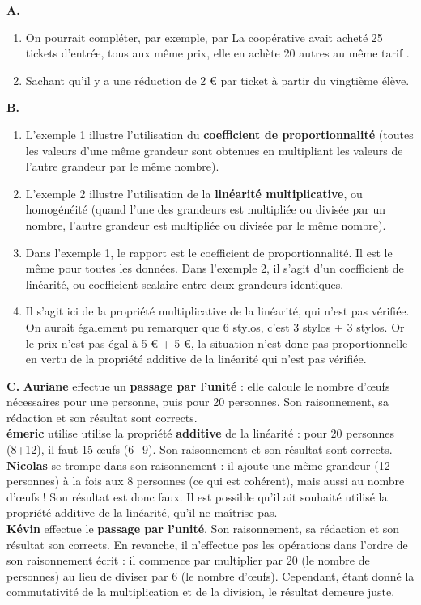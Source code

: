\begin{corrige}
{\bf A.} 
\begin{enumerate}
   \item On pourrait compléter, par exemple, par \og La coopérative avait acheté 25 tickets d'entrée, tous aux même prix, elle en achète 20 autres au même tarif \fg.
   \item \og Sachant qu'il y a une réduction de 2 \euro{} par ticket à partir du vingtième élève. \fg{} \\
\end{enumerate}

{\bf B.} 
\begin{enumerate}
   \item L'exemple 1 illustre l'utilisation du {\bf coefficient de proportionnalité} (toutes les valeurs d'une même grandeur sont obtenues en multipliant les valeurs de l'autre grandeur par le même nombre).
   \item L'exemple 2 illustre l'utilisation de la {\bf linéarité multiplicative}, ou homogénéité (quand l'une des grandeurs est multipliée ou divisée par un nombre, l'autre grandeur est multipliée ou divisée par le même nombre).
   \item Dans l'exemple 1, le rapport est le coefficient de proportionnalité. Il est le même pour toutes les données. Dans l'exemple 2, il s'agit d'un coefficient de linéarité, ou coefficient scalaire entre deux grandeurs identiques.
   \item Il s'agit ici de la propriété multiplicative de la linéarité, qui n'est pas vérifiée. \\
   On aurait également pu remarquer que 6 stylos, c'est 3 stylos + 3 stylos. Or le prix n'est pas égal à 5 \euro{} + 5 \euro{}, la situation n'est donc pas proportionnelle en vertu de la propriété additive de la linéarité qui n'est pas vérifiée. \\
\end{enumerate}

{\bf C.} {\bf Auriane} effectue un {\bf passage par l'unité} : elle calcule le nombre d'\oe ufs nécessaires pour une personne, puis pour 20 personnes. Son raisonnement, sa rédaction et son résultat sont corrects. \\
   {\bf émeric} utilise utilise la propriété {\bf additive} de la linéarité : pour 20 personnes (8+12), il faut 15 \oe ufs (6+9). Son raisonnement et son résultat sont corrects. \\
   {\bf Nicolas} se trompe dans son raisonnement : il ajoute une même grandeur (12 personnes) à la fois aux 8 personnes (ce qui est cohérent), mais aussi au nombre d'\oe ufs ! Son résultat est donc faux. Il est possible qu'il ait souhaité utilisé la propriété additive de la linéarité, qu'il ne maîtrise pas. \\
   {\bf Kévin} effectue le {\bf passage par l'unité}. Son raisonnement, sa rédaction et son résultat son corrects. En revanche, il n'effectue pas les opérations dans l'ordre de son raisonnement écrit : il commence par multiplier par 20 (le nombre de personnes) au lieu de diviser par 6 (le nombre d'\oe ufs). Cependant, étant donné la commutativité de la multiplication et de la division, le résultat demeure juste. \\


\end{corrige}
